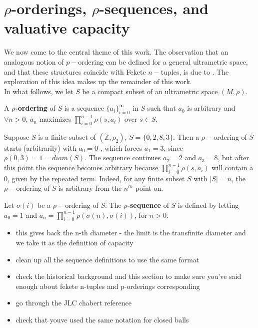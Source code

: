 

\newpage
\section*{$\rho$-orderings, $\rho$-sequences, and valuative capacity}

We now come to the central theme of this work. The observation that an analogous notion of $p-$ordering can be defined for a general ultrametric space, and that these structures coincide with Fekete $n-$tuples, is due to \cite{kj}. The exploration of this idea makes up the remainder of this work. \\ 

In what follows, we let $S$ be a compact subset of an ultrametric space $(M,\rho)$.\\

\begin{definition}
	\cite{kj} A \textbf{$\rho$-ordering} of $S$ is a sequence $\{a_i\}_{i=0}^\infty$ in $S$ such that $a_0$ is arbitrary and $\forall n > 0$, $a_n$ maximizes $\prod_{i=0}^{n-1} \rho(s,a_i)$ over $s \in S$. 
\end{definition}

\begin{example}
Suppose $S$ is a finite subset of $(\mathbb{Z}, \rho_2)$, $S=\{0,2,8,3\}$. Then a $\rho-$ordering of $S$ starts (arbitrarily) with $a_0=0$ , which forces $a_1=3$, since $\rho(0,3)=1=diam(S)$. The sequence continues $a_2=2$ and $a_3=8$, but after this point the sequence becomes arbitrary because  $\prod_{i=0}^{n-1} \rho(s,a_i)$ will contain a $0$, given by the repeated term. Indeed, for any finite subset $S$ with $\lvert S \rvert = n$, the $\rho-$ordering of $S$ is arbitrary from the $n^{th}$ point on. 
\end{example}

\begin{definition}
	\cite{kj} Let $\sigma(i)$ be a $\rho-$ordering of $S$. The \textbf{$\rho$-sequence} of $S$ is defined by letting $a_0=1$  and $a_n=\prod_{i=0}^{n-1} \rho(\sigma(n),\sigma(i))$, for $n > 0$.
\end{definition}

\begin{itemize}
\item this gives back the n-th diameter - the limit is the transfinite diameter and we take it as the definition of capacity
\item clean up all the sequence definitions to use the same format
\item check the historical background and this section to make sure you've said enough about fekete n-tuples and p-orderings corresponding
\item go through the JLC chabert reference
\item check that youve used the same notation for closed balls
\end{itemize}


